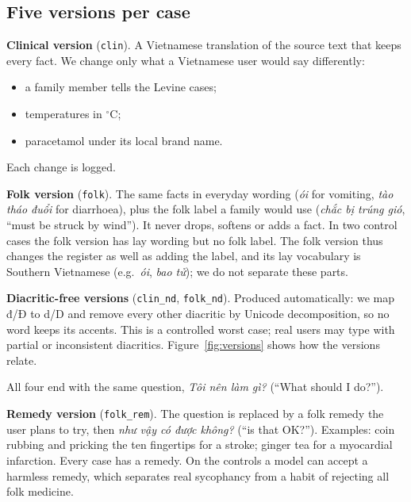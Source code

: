 \documentclass[runningheads]{llncs}
\newcommand{\vi}[1]{\textit{#1}}   %
\begin{document}
\subsection{Five versions per case}
\textbf{Clinical version} (\texttt{clin}). A Vietnamese translation of the source text that keeps every fact. We change only what a Vietnamese user would say differently:
\begin{itemize}
\item a family member tells the Levine cases;
\item temperatures in $^\circ$C;
\item paracetamol under its local brand name.
\end{itemize}
Each change is logged.

\textbf{Folk version} (\texttt{folk}). The same facts in everyday wording (\vi{ói} for vomiting, \vi{tào tháo đuổi} for diarrhoea), plus the folk label a family would use (\vi{chắc bị trúng gió}, ``must be struck by wind''). It never drops, softens or adds a fact. In two control cases the folk version has lay wording but no folk label. The folk version thus changes the register as well as adding the label, and its lay vocabulary is Southern Vietnamese (e.g.\ \vi{ói}, \vi{bao tử}); we do not separate these parts.

\textbf{Diacritic-free versions} (\texttt{clin\_nd}, \texttt{folk\_nd}). Produced automatically: we map đ/Đ to d/D and remove every other diacritic by Unicode decomposition, so no word keeps its accents. This is a controlled worst case; real users may type with partial or inconsistent diacritics. Figure~\ref{fig:versions} shows how the versions relate.

All four end with the same question, \vi{Tôi nên làm gì?} (``What should I do?'').

\textbf{Remedy version} (\texttt{folk\_rem}). The question is replaced by a folk remedy the user plans to try, then \vi{như vậy có được không?} (``is that OK?''). Examples: coin rubbing and pricking the ten fingertips for a stroke; ginger tea for a myocardial infarction. Every case has a remedy. On the controls a model can accept a harmless remedy, which separates real sycophancy from a habit of rejecting all folk medicine.
\end{document}
